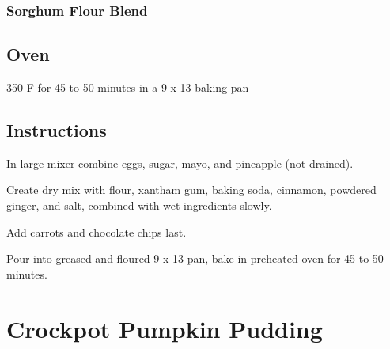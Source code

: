 \documentclass[ansiapaper,10pt,english]{sphinxmanual}
\begin{document}
\subsection{Sorghum Flour Blend}
\label{\detokenize{carrotcake:sorghum-flour-blend}}
%
\begin{sphinxVerbatim}[commandchars=\\\{\}]
    

    

   
\end{sphinxVerbatim}


\section{Oven}
\label{\detokenize{carrotcake:oven}}
350 F for 45 to 50 minutes in a 9 x 13 baking pan


\section{Instructions}
\label{\detokenize{carrotcake:instructions}}
In large mixer combine eggs, sugar, mayo, and pineapple (not drained).

Create dry mix with flour, xantham gum, baking soda, cinnamon, powdered ginger, and salt, combined with wet ingredients slowly.

Add carrots and chocolate chips last.

Pour into greased and floured 9 x 13 pan, bake in preheated oven for 45 to 50 minutes.


\chapter{Crockpot Pumpkin Pudding}
\label{\detokenize{Crockpot_Pumpkin_P:crockpot-pumpkin-pudding}}\label{\detokenize{Crockpot_Pumpkin_P::doc}}
\end{document}
